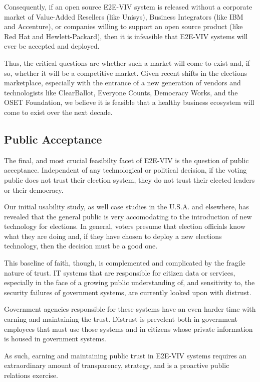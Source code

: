 Consequently, if an open source E2E-VIV system is released without a
corporate market of Value-Added Resellers (like Unisys), Business
Integrators (like IBM and Accenture), or companies willing to support
an open source product (like Red Hat and Hewlett-Packard), then it is
infeasible that E2E-VIV systems will ever be accepted and deployed.

Thus, the critical questions are whether such a market will come to
exist and, if so, whether it will be a competitive market. Given
recent shifts in the elections marketplace, especially with the
entrance of a new generation of vendors and technologists like
ClearBallot, Everyone Counts, Democracy Works, and the OSET
Foundation, we believe it is feasible that a healthy business
ecosystem will come to exist over the next decade.

\subsection{Public Acceptance}

The final, and most crucial feasibilty facet of E2E-VIV is the
question of public acceptance.  Independent of any technological or
political decision, if the voting public does not trust their election
system, they do not trust their elected leaders or their democracy.

Our initial usability study, as well case studies in the U.S.A. and
elsewhere, has revealed that the general public is very accomodating
to the introduction of new technology for elections.  In general,
voters presume that election officials know what they are doing and,
if they have chosen to deploy a new elections technology, then the
decision must be a good one.

This baseline of faith, though, is complemented and complicated by the
fragile nature of trust.  IT systems that are responsible for citizen
data or services, especially in the face of a growing public
understanding of, and sensitivity to, the security failures of
government systems, are currently looked upon with distrust.

Government agencies responsible for these systems have an even harder
time with earning and maintaining the trust.  Distrust is prevelent
both in government employees that must use those systems and in
citizens whose private information is housed in government systems.

As such, earning and maintaining public trust in E2E-VIV systems
requires an extraordinary amount of transparency, strategy, and is a
proactive public relations exercise.  

